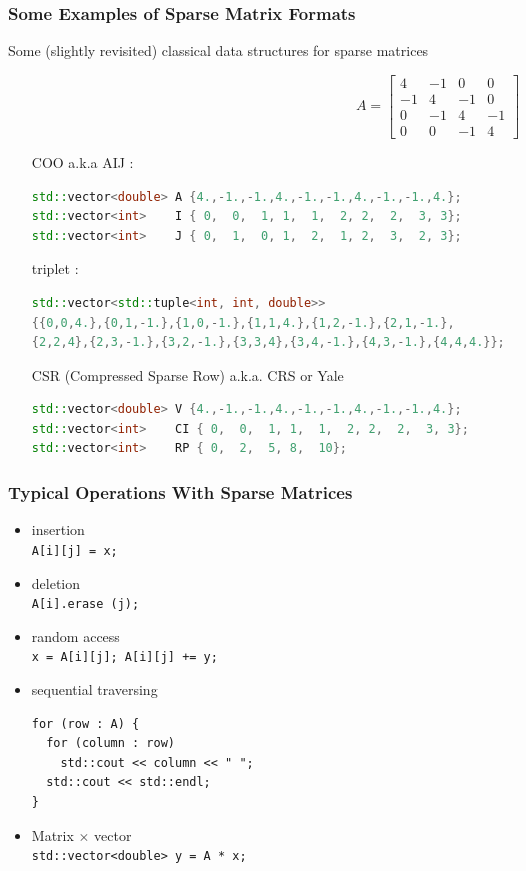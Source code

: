 \documentclass{beamer}
\begin{document}
\begin{frame}[fragile]
\frametitle{Some Examples of Sparse Matrix Formats}
Some (slightly revisited) classical data structures for sparse matrices

$$
A = 
\left[
\begin{array}{cccc}
4  & -1 & 0  & 0\\
-1 &  4 & -1 & 0\\
0  & -1 &  4 & -1\\
0  &  0 &  -1& 4
\end{array}
\right]
$$

\begin{itemize}
\item [COO] a.k.a AIJ :\\ \tiny
\begin{lstlisting}[language=C++]
std::vector<double> A {4.,-1.,-1.,4.,-1.,-1.,4.,-1.,-1.,4.};
std::vector<int>    I { 0,  0,  1, 1,  1,  2, 2,  2,  3, 3};
std::vector<int>    J { 0,  1,  0, 1,  2,  1, 2,  3,  2, 3};
\end{lstlisting} \normalsize
\item [triplet] :\\ \tiny
\begin{lstlisting}[language=C++]
std::vector<std::tuple<int, int, double>> 
{{0,0,4.},{0,1,-1.},{1,0,-1.},{1,1,4.},{1,2,-1.},{2,1,-1.},
{2,2,4},{2,3,-1.},{3,2,-1.},{3,3,4},{3,4,-1.},{4,3,-1.},{4,4,4.}};                                           
\end{lstlisting} \normalsize
\item [CSR] (Compressed Sparse Row) a.k.a. CRS or Yale\\ \tiny
\begin{lstlisting}[language=C++]
std::vector<double> V {4.,-1.,-1.,4.,-1.,-1.,4.,-1.,-1.,4.};
std::vector<int>    CI { 0,  0,  1, 1,  1,  2, 2,  2,  3, 3};
std::vector<int>    RP { 0,  2,  5, 8,  10};
\end{lstlisting} 
\end{itemize}
\end{frame}

\begin{frame}[fragile]
\frametitle{Typical Operations With Sparse Matrices} 
\begin{itemize}
\item insertion \\
\lstinline|A[i][j] = x;|
\item deletion \\
\lstinline|A[i].erase (j);|
\item random access \\
\lstinline|x = A[i][j]; A[i][j] += y;|
\item sequential traversing \\
\small\begin{lstlisting}
for (row : A) {
  for (column : row)
  	std::cout << column << " ";
  std::cout << std::endl;
}
\end{lstlisting}\normalsize
\item Matrix $\times$ vector\\
\lstinline|std::vector<double> y = A * x;|
\end{itemize}
\end{frame}
\end{document}
